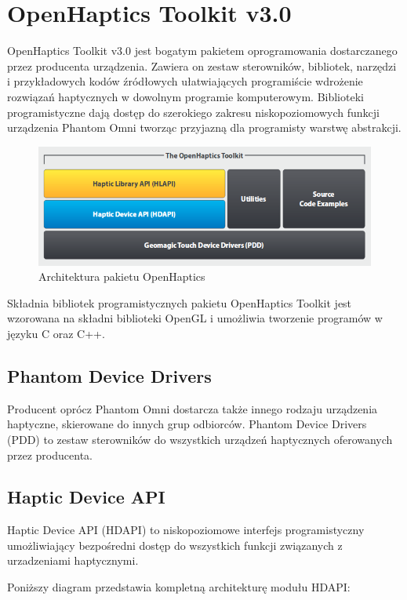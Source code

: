 \documentclass[licencjacka]{pracamgr}
\begin{document}
\section{OpenHaptics Toolkit v3.0}

OpenHaptics Toolkit v3.0 jest bogatym pakietem oprogramowania dostarczanego przez producenta urządzenia. Zawiera on zestaw sterowników, bibliotek, narzędzi i przykładowych kodów źródłowych ułatwiających programiście wdrożenie rozwiązań haptycznych w dowolnym programie komputerowym. Biblioteki programistyczne dają dostęp do szerokiego zakresu niskopoziomowych funkcji urządzenia Phantom Omni tworząc przyjazną dla programisty warstwę abstrakcji. 

\begin{figure}[H]
\centering
\includegraphics[scale=0.5,center]{openhaptics}
\caption{Architektura pakietu OpenHaptics}
\end{figure}

Składnia bibliotek programistycznych pakietu OpenHaptics Toolkit jest wzorowana na składni biblioteki OpenGL i umożliwia tworzenie programów w języku C oraz C++. 

\subsection{Phantom Device Drivers}
Producent oprócz Phantom Omni dostarcza także innego rodzaju urządzenia haptyczne, skierowane do innych grup odbiorców. Phantom Device Drivers (PDD) to zestaw sterowników do wszystkich urządzeń haptycznych oferowanych przez producenta. 

\subsection{Haptic Device API}
Haptic Device API (HDAPI) to niskopoziomowe interfejs programistyczny umożliwiający bezpośredni dostęp do wszystkich funkcji związanych z urzadzeniami haptycznymi.

Poniższy diagram przedstawia kompletną architekturę modułu HDAPI:
\end{document}
